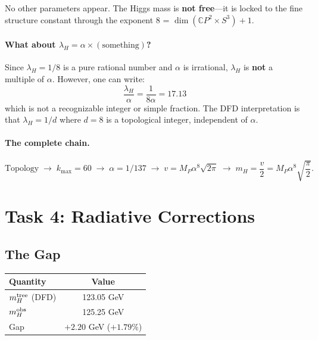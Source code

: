 \documentclass[11pt]{article}
\theoremstyle{definition}
\begin{document}
No other parameters appear. The Higgs mass is \textbf{not free}---it is
locked to the fine structure constant through the exponent 8 =
$\dim(\mathbb{C}P^2 \times S^3) + 1$.

\paragraph{What about $\lambda_H = \alpha \times (\text{something})$?}
Since $\lambda_H = 1/8$ is a pure rational number and $\alpha$ is irrational,
$\lambda_H$ is \textbf{not} a multiple of $\alpha$. However, one can write:
\begin{equation}
\frac{\lambda_H}{\alpha} = \frac{1}{8\alpha} = 17.13
\end{equation}
which is not a recognizable integer or simple fraction. The DFD interpretation
is that $\lambda_H = 1/d$ where $d = 8$ is a topological integer, independent
of $\alpha$.

\paragraph{The complete chain.}
\begin{equation}
\text{Topology} \;\to\; k_{\max} = 60 \;\to\; \alpha = 1/137
\;\to\; v = M_P \alpha^8 \sqrt{2\pi}
\;\to\; m_H = \frac{v}{2} = M_P \alpha^8 \sqrt{\frac{\pi}{2}}.
\end{equation}

\section{Task 4: Radiative Corrections}
\label{sec:radiative}

\subsection{The Gap}

\begin{center}
\renewcommand{\arraystretch}{1.3}
\begin{tabular}{lc}
\toprule
Quantity & Value \\
\midrule
$m_H^{\rm tree}$ (DFD) & 123.05 GeV \\
$m_H^{\rm obs}$ & 125.25 GeV \\
Gap & $+2.20$ GeV ($+1.79\%$) \\
\bottomrule
\end{tabular}
\end{center}
\end{document}
